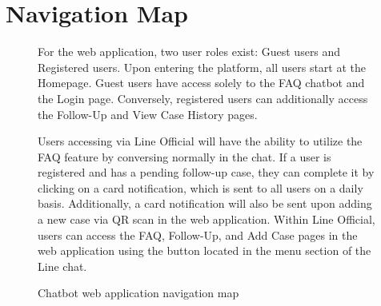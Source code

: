 \documentclass[12pt,oneside,openright,a4paper]{cpe-english-project}
\begin{document}
  \section{Navigation Map}
    \begin{figure}[!h]
      \centering
      \caption{Chatbot web application navigation map}\label{fig:Navigation_Map}
      \begin{justify}
        \qquad For the web application, two user roles exist: Guest users and Registered users. Upon entering the platform, all users start at the Homepage. Guest users have access solely to the FAQ chatbot and the Login page. Conversely, registered users can additionally access the Follow-Up and View Case History pages.  \par
        \qquad Users accessing via Line Official will have the ability to utilize the FAQ feature by conversing normally in the chat. If a user is registered and has a pending follow-up case, they can complete it by clicking on a card notification, which is sent to all users on a daily basis. Additionally, a card notification will also be sent upon adding a new case via QR scan in the web application. Within Line Official, users can access the FAQ, Follow-Up, and Add Case pages in the web application using the button located in the menu section of the Line chat.\par
      \end{justify}
    \end{figure}
\end{document}

